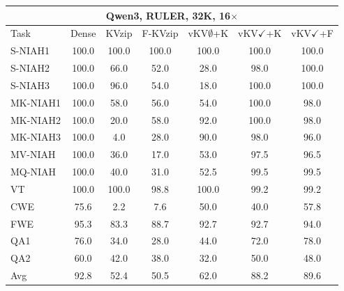 \begin{tabular}{lcccccc}
\toprule
\multicolumn{7}{c}{Qwen3, RULER, 32K, 16$\times$} \\
\midrule
Task & Dense & KVzip & F-KVzip & vKV$\emptyset$+K & vKV$\checkmark$+K & vKV$\checkmark$+F \\
\midrule
S-NIAH1 & 100.0 & 100.0 & 100.0 & 100.0 & 100.0 & 100.0 \\
S-NIAH2 & 100.0 & 66.0 & 52.0 & 28.0 & 98.0 & 100.0 \\
S-NIAH3 & 100.0 & 96.0 & 54.0 & 18.0 & 100.0 & 100.0 \\
MK-NIAH1 & 100.0 & 58.0 & 56.0 & 54.0 & 100.0 & 98.0 \\
MK-NIAH2 & 100.0 & 20.0 & 58.0 & 92.0 & 100.0 & 98.0 \\
MK-NIAH3 & 100.0 & 4.0 & 28.0 & 90.0 & 98.0 & 96.0 \\
MV-NIAH & 100.0 & 36.0 & 17.0 & 53.0 & 97.5 & 96.5 \\
MQ-NIAH & 100.0 & 40.0 & 31.0 & 52.5 & 99.5 & 99.5 \\
VT & 100.0 & 100.0 & 98.8 & 100.0 & 99.2 & 99.2 \\
CWE & 75.6 & 2.2 & 7.6 & 50.0 & 40.0 & 57.8 \\
FWE & 95.3 & 83.3 & 88.7 & 92.7 & 92.7 & 94.0 \\
QA1 & 76.0 & 34.0 & 28.0 & 44.0 & 72.0 & 78.0 \\
QA2 & 60.0 & 42.0 & 38.0 & 32.0 & 50.0 & 48.0 \\
\midrule
Avg & 92.8 & 52.4 & 50.5 & 62.0 & 88.2 & 89.6 \\
\bottomrule
\end{tabular}
\vspace{0.8em}

